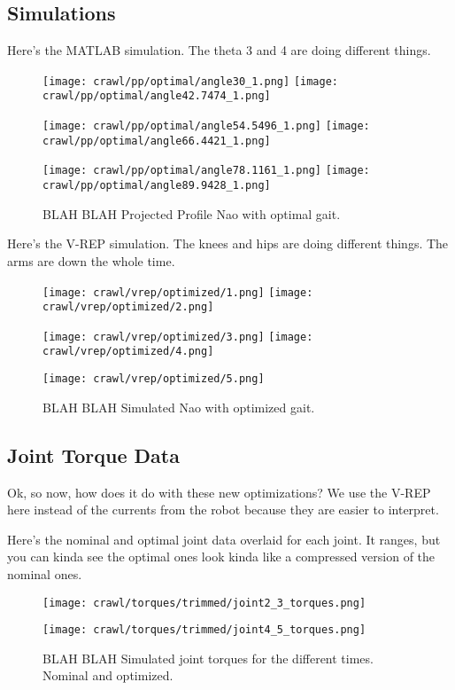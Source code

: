 \subsection{Simulations}

Here's the MATLAB simulation. The theta 3 and 4 are doing different things.

\begin{figure}
  \centerline{
    \texttt{[image: crawl/pp/optimal/angle30\_1.png]}
    \texttt{[image: crawl/pp/optimal/angle42.7474\_1.png]}
  }
  \centerline{
    \texttt{[image: crawl/pp/optimal/angle54.5496\_1.png]}
    \texttt{[image: crawl/pp/optimal/angle66.4421\_1.png]}
  }
  \centerline{
    \texttt{[image: crawl/pp/optimal/angle78.1161\_1.png]}
    \texttt{[image: crawl/pp/optimal/angle89.9428\_1.png]}
  }
  \caption{BLAH BLAH Projected Profile Nao with optimal gait.}
  \label{fig:pp_opt_gait1}
\end{figure}

Here's the V-REP simulation. The knees and hips are doing different things.
The arms are down the whole time.

\begin{figure}
  \centerline{
    \texttt{[image: crawl/vrep/optimized/1.png]}
    \texttt{[image: crawl/vrep/optimized/2.png]}
  }
  \centerline{
    \texttt{[image: crawl/vrep/optimized/3.png]}
    \texttt{[image: crawl/vrep/optimized/4.png]}
  }
  \centerline{
    \texttt{[image: crawl/vrep/optimized/5.png]}
  }
  \caption{BLAH BLAH Simulated Nao with optimized gait.}
  \label{fig:vrep_nao_opt_gait1}
\end{figure}

\subsection{Joint Torque Data} \label{subsec:opt_joint_torque_data}

Ok, so now, how does it do with these new optimizations?
We use the V-REP here instead of the currents from the robot because they are easier to interpret.

Here's the nominal and optimal joint data overlaid for each joint.
It ranges, but you can kinda see the optimal ones look kinda like a compressed version of the
nominal ones.

\begin{figure}
  \centerline{
    \texttt{[image: crawl/torques/trimmed/joint2\_3\_torques.png]}
  }
  \centerline{
    \texttt{[image: crawl/torques/trimmed/joint4\_5\_torques.png]}
  }
  \caption{BLAH BLAH Simulated joint torques for the different times. Nominal and optimized.}
  \label{fig:vrep_joint_torques_by_joint1}
\end{figure}

